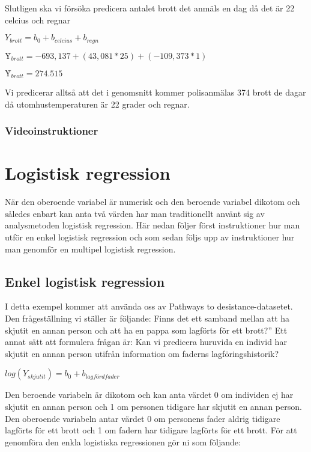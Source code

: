 \documentclass[
]{book}
\begin{document}
Slutligen ska vi försöka predicera antalet brott det anmäls en dag då det är 22 celcius och regnar

\(Y_{brott} = b_0 + b_{celcius} + b_{regn}\)

\(Ŷ_{brott} = -693,137 + (43,081*25) + (-109,373*1)\)

\(Ŷ_{brott} = 274.515\)

Vi predicerar alltså att det i genomsnitt kommer polisanmälas 374 brott de dagar då utomhustemperaturen är 22 grader och regnar.

\hypertarget{videoinstruktioner-10}{%
\subsection{Videoinstruktioner}\label{videoinstruktioner-10}}

\hypertarget{logistisk-regression}{%
\chapter{Logistisk regression}\label{logistisk-regression}}

När den oberoende variabel är numerisk och den beroende variabel dikotom och således enbart kan anta två värden har man traditionellt använt sig av analysmetoden logistisk regression.
Här nedan följer först instruktioner hur man utför en enkel logistisk regression och som sedan följs upp av instruktioner hur man genomför en multipel logistisk regression.

\hypertarget{enkel-logistisk-regression}{%
\section{Enkel logistisk regression}\label{enkel-logistisk-regression}}

I detta exempel kommer att använda oss av Pathways to desistance-datasetet. Den frågeställning vi ställer är följande: Finns det ett samband mellan att ha skjutit en annan person och att ha en pappa som lagförts för ett brott?'' Ett annat sätt att formulera frågan är: Kan vi predicera huruvida en individ har skjutit en annan person utifrån information om faderns lagföringshistorik?

\(log(Y_{skjutit}) = b_0 + b_{lagfördfader}\)

Den beroende variabeln är dikotom och kan anta värdet 0 om individen ej har skjutit en annan person och 1 om personen tidigare har skjutit en annan person. Den oberoende variabeln antar värdet 0 om personens fader aldrig tidigare lagförts för ett brott och 1 om fadern har tidigare lagförts för ett brott. För att genomföra den enkla logistiska regressionen gör ni som följande:
\end{document}

